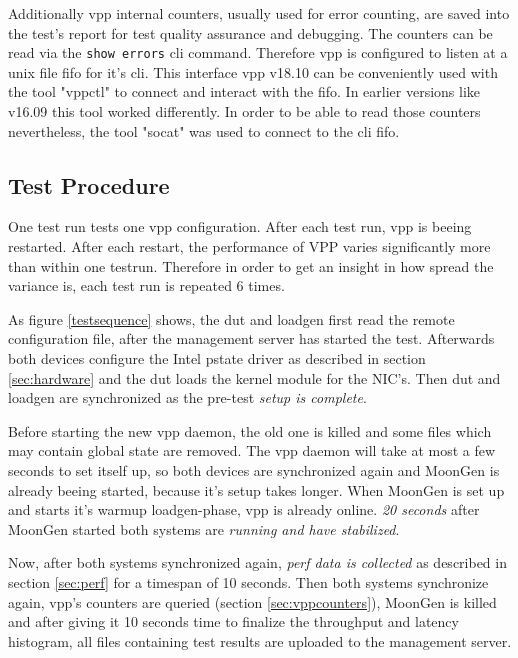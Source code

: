 Additionally \Ac{vpp} internal counters, usually used for error
counting, are saved into the test's report for test quality assurance
and debugging. The counters can be read via the \lstinline|show errors|
 \Ac{cli} command. Therefore \Ac{vpp} is configured to listen
at a unix file fifo for it's \Ac{cli}. This interface \Ac{vpp} v18.10
can be conveniently used with the tool "vppctl" to connect and
interact with the fifo. In earlier versions like v16.09 this tool
worked differently. In order to be able to read those counters
nevertheless, the tool "socat" was used to connect to the \Ac{cli}
fifo.


\subsection{Test Procedure}

One test run tests one vpp configuration. After each test run, vpp is
beeing restarted. After each restart, the performance of VPP varies
significantly more than within one testrun. Therefore in order to get
an insight in how spread the variance is, each test run is repeated 6
times. 

As figure \ref{testsequence} shows, the \Ac{dut} and \Ac{loadgen}
first read the remote configuration file, after the management server
has started the test. Afterwards both devices configure the Intel
pstate driver  as described in section \ref{sec:hardware} and the
\Ac{dut} loads the kernel module for the NIC's. Then \Ac{dut} and
\Ac{loadgen} are synchronized as the pre-test \textit{setup is
complete}.

Before starting the new \Ac{vpp} daemon, the old one is killed and
some files which may contain global state are removed. The \Ac{vpp}
daemon will take at most a few seconds to set itself up, so both
devices are synchronized again and MoonGen is already beeing started,
because it's setup takes longer. When MoonGen is set up and starts
it's warmup loadgen-phase, \Ac{vpp} is already online. \textit{20
seconds} after MoonGen started both systems are \textit{running and
have stabilized}.

Now, after both systems synchronized again, \textit{\Ac{perf} data is
collected} as described in section \ref{sec:perf} for a timespan of 10
seconds. Then both systems synchronize again, \Ac{vpp}'s counters are
queried (section \ref{sec:vppcounters}), MoonGen is killed and after
giving it 10 seconds time to finalize the throughput and latency
histogram, all files containing test results are uploaded to the
management server.

